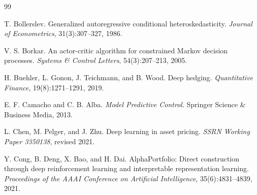 \documentclass[10pt,twocolumn]{article}
\begin{document}
\begin{thebibliography}{99}

T. Bollerslev.
\newblock Generalized autoregressive conditional heteroskedasticity.
\newblock \emph{Journal of Econometrics}, 31(3):307--327, 1986.


V. S. Borkar.
\newblock An actor-critic algorithm for constrained Markov decision processes.
\newblock \emph{Systems \& Control Letters}, 54(3):207--213, 2005.


H. Buehler, L. Gonon, J. Teichmann, and B. Wood.
\newblock Deep hedging.
\newblock \emph{Quantitative Finance}, 19(8):1271--1291, 2019.


E. F. Camacho and C. B. Alba.
\newblock \emph{Model Predictive Control}.
\newblock Springer Science \& Business Media, 2013.


L. Chen, M. Pelger, and J. Zhu.
\newblock Deep learning in asset pricing.
\newblock \emph{SSRN Working Paper 3350138}, revised 2021.


Y. Cong, B. Deng, X. Bao, and H. Dai.
\newblock AlphaPortfolio: Direct construction through deep reinforcement learning
  and interpretable representation learning.
\newblock \emph{Proceedings of the AAAI Conference on Artificial Intelligence},
  35(6):4831--4839, 2021.


\end{thebibliography}
\end{document}
